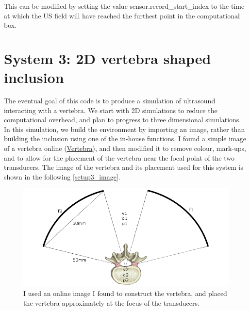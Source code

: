 \documentclass[10pt,a4paper]{article}
\begin{document}
This can be modified by setting the value sensor.record\_start\_index to the time at which the US field will have reached the furthest point in the computational box. 


\section*{System 3: 2D vertebra shaped inclusion}

The eventual goal of this code is to produce a simulation of ultrasound interacting with a vertebra. We start with 2D simulations to reduce the computational overhead, and plan to progress to three dimensional simulations. In this simulation, we build the environment by importing an image, rather than building the inclusion using one of the in-house functions. I found a simple image of a vertebra online (\href{https://www.cedars-sinai.edu/Patients/Programs-and-Services/Spine-Center/The-Patient-Guide/Anatomy-of-the-Spine/Vertebrae-of-the-Spine.aspx}{Vertebra}), and then modified it to remove colour, mark-ups, and to allow for the placement of the vertebra near the focal point of the two transducers. The image of the vertebra and its placement used for this system is shown in the following \autoref{setup3_image}.

\begin{figure}[H]
\centering
\includegraphics[scale=0.5]{setup3.png}
\caption{I used an online image I found to construct the vertebra, and placed the vertebra approximately at the focus of the transducers.}\label{setup3_image}
\end{figure}
\end{document}
